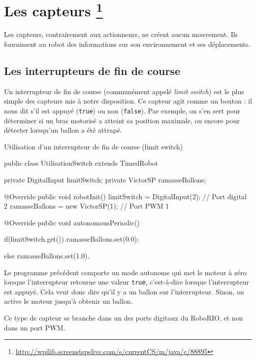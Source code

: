 \documentclass[12pt]{report}
\begin{document}
\chapter[Les capteurs]{Les capteurs \footnote{\url{http://wpilib.screenstepslive.com/s/currentCS/m/java/c/88895}}}

Les capteurs, contrairement aux actionneurs, ne créent aucun mouvement. Ils fournissent au robot des informations sur son environnement et ses déplacements.


\section{Les interrupteurs de fin de course}

Un interrupteur de fin de course (communément appelé \textit{limit switch}) est le plus simple des capteurs mis à notre disposition. Ce capteur agit comme un bouton : il nous dit s'il est appuyé (\texttt{true}) ou non (\texttt{false}). Par exemple, on s'en sert pour déterminer si un bras motorisé a atteint sa position maximale, ou encore pour détecter lorsqu'un ballon a été attrapé.

\begin{MyTCB}{Utilisation d'un interrupteur de fin de course (limit switch)}

public class UtilisationSwitch extends TimedRobot {
	
	private DigitalInput limitSwitch;
	private VictorSP ramasseBallons;
	
	@Override
	public void robotInit() {
		limitSwitch = DigitalInput(2); // Port digital 2
		ramasseBallons = new VictorSP(1); // Port PWM 1
	}

	@Override
	public void autonomousPeriodic() {
	
		if(limitSwitch.get())
			ramasseBallons.set(0.0);
			
		else
			ramasseBallons.set(1.0).

	}

}	
	
\end{MyTCB}

Le programme précédent comporte un mode autonome qui met le moteur à zéro lorsque l'interrupteur retourne une valeur \texttt{true}, c'est-à-dire lorsque l'interrupteur est appuyé. Cela veut donc dire qu'il y a un ballon sur l'interrupteur. Sinon, on active le moteur jusqu'à obtenir un ballon.

Ce type de capteur se branche dans un des ports digitaux du RoboRIO, et non dans un port PWM.
\end{document}
